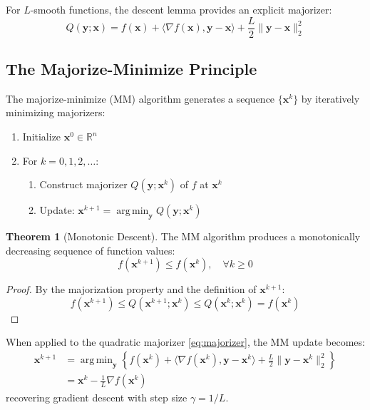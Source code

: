 \documentclass[12pt]{article}
\renewcommand{\vec}[1]{\mathbf{#1}}
\DeclareMathOperator{\argmin}{arg\,min}
\newcommand{\norm}[1]{\lVert #1 \rVert}
\newcommand{\R}{\mathbb{R}}
\theoremstyle{definition}
\newtheorem{theorem}{Theorem}[section]
\begin{document}
For $L$-smooth functions, the descent lemma provides an explicit majorizer:
\begin{equation}\label{eq:majorizer}
    Q(\vec{y}; \vec{x}) = f(\vec{x}) + \langle \nabla f(\vec{x}), \vec{y} - \vec{x} \rangle + \frac{L}{2}\norm{\vec{y} - \vec{x}}_2^2
\end{equation}

\subsection{The Majorize-Minimize Principle}

The majorize-minimize (MM) algorithm generates a sequence $\{\vec{x}^k\}$ by iteratively minimizing majorizers:

\begin{algorithm}
    \begin{enumerate}
        \item Initialize $\vec{x}^0 \in \R^n$
        \item For $k = 0, 1, 2, \ldots$:
              \begin{enumerate}[label=(\alph*)]
                  \item Construct majorizer $Q(\vec{y}; \vec{x}^k)$ of $f$ at $\vec{x}^k$
                  \item Update: $\vec{x}^{k+1} = \argmin_{\vec{y}} Q(\vec{y}; \vec{x}^k)$
              \end{enumerate}
    \end{enumerate}
\end{algorithm}

\begin{theorem}[Monotonic Descent]
    The MM algorithm produces a monotonically decreasing sequence of function values:
    \begin{equation}
        f(\vec{x}^{k+1}) \leq f(\vec{x}^k), \quad \forall k \geq 0
    \end{equation}
\end{theorem}

\begin{proof}
    By the majorization property and the definition of $\vec{x}^{k+1}$:
    \begin{equation}
        f(\vec{x}^{k+1}) \leq Q(\vec{x}^{k+1}; \vec{x}^k) \leq Q(\vec{x}^k; \vec{x}^k) = f(\vec{x}^k)
    \end{equation}
\end{proof}

When applied to the quadratic majorizer \eqref{eq:majorizer}, the MM update becomes:
\begin{align}
    \vec{x}^{k+1} & = \argmin_{\vec{y}} \left\{ f(\vec{x}^k) + \langle \nabla f(\vec{x}^k), \vec{y} - \vec{x}^k \rangle + \frac{L}{2}\norm{\vec{y} - \vec{x}^k}_2^2 \right\} \\
                  & = \vec{x}^k - \frac{1}{L}\nabla f(\vec{x}^k)
\end{align}
recovering gradient descent with step size $\gamma = 1/L$.
\end{document}
